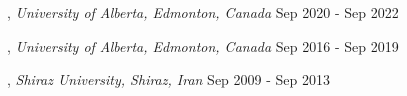 , \textit{University of Alberta, Edmonton, Canada}	\hfill Sep 2020 -  Sep 2022

, \textit{University of Alberta, Edmonton, Canada}	\hfill Sep 2016 -  Sep 2019

, \textit{Shiraz University, Shiraz, Iran} \hfill	Sep 2009 - Sep 2013


